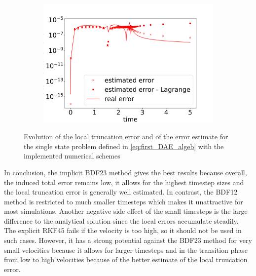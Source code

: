\begin{figure}[H]
\begin{subfigure}{0.32\textwidth}
    	\includegraphics[width=1\textwidth]{images/errorEstimateBDF23.png}
        \label{fig:errorEstimateEvolutionBDF23}
    \end{subfigure}
    \caption{Evolution of the local truncation error and of the error estimate for the single state problem defined in \autoref{eq:first_DAE_algeb} with the implemented numerical schemes}
    \label{fig:errorEstimateEvolutionALL}
\end{figure}

In conclusion, the implicit BDF23 method gives the best results because overall, the induced total error remains low, it allows for the highest timestep sizes and the local truncation error is generally well estimated. In contrast, the BDF12 method is restricted to much smaller timesteps which makes it unattractive for most simulations. Another negative side effect of the small timesteps is the large difference to the analytical solution since the local errors accumulate steadily. The explicit RKF45 fails if the velocity is too high, so it should not be used in such cases. However, it has a strong potential against the BDF23 method for very small velocities because it allows for larger timesteps and in the transition phase from low to high velocities because of the better estimate of the local truncation error.



